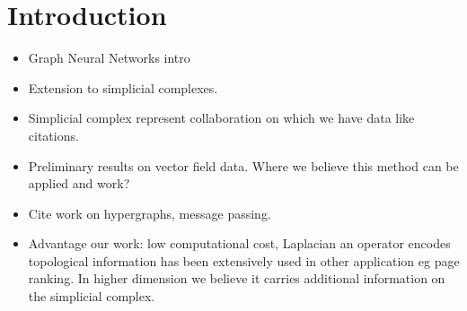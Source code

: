 \section{Introduction}

\begin{itemize}
\item Graph Neural Networks intro
\item Extension to simplicial complexes. 
\item Simplicial complex represent collaboration on which we have data like citations.
\item Preliminary results on vector field data. Where we believe this method can be applied and work?
\item Cite work on hypergraphs, message passing.
\item Advantage our work: low computational cost, Laplacian an operator encodes topological information has been extensively used in other application eg page ranking. In higher dimension we believe it carries additional information on the simplicial complex.
\end{itemize}




















